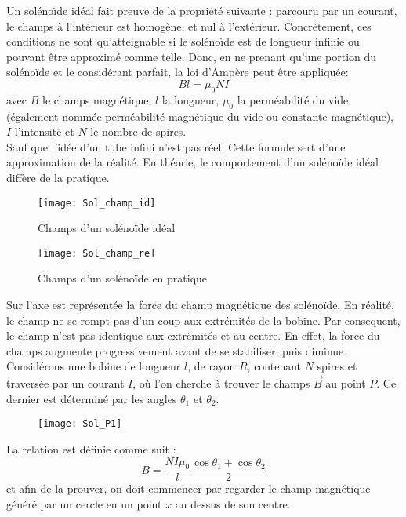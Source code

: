 Un solénoïde idéal fait preuve de la propriété suivante : parcouru par un courant, le champs à l'intérieur est homogène, et nul à l'extérieur. Concrètement, ces conditions ne sont qu'atteignable si le solénoïde est de longueur infinie ou pouvant être approximé comme telle. Donc, en ne prenant qu'une portion du solénoïde et le considérant parfait, la loi d'Ampère peut être appliquée:
$$
    Bl = \mu_0 NI 
$$
avec $B$ le champs magnétique, $l$ la longueur, $\mu_0$ la perméabilité du vide (également nommée perméabilité magnétique du vide ou constante magnétique), $I$ l'intensité et $N$ le nombre de spires.\\
Sauf que l'idée d'un tube infini n'est pas réel. Cette formule sert d'une approximation de la réalité. En théorie, le comportement d'un solénoïde idéal diffère de la pratique.
\begin{figure}[H]
  \centering
  \begin{minipage}[b]{0.4\textwidth}
    \texttt{[image: Sol\_champ\_id]}
    \caption{Champs d'un solénoïde idéal}
  \end{minipage}
  \hfill
  \begin{minipage}[b]{0.4\textwidth}
    \texttt{[image: Sol\_champ\_re]}
    \caption{Champs d'un solénoïde en pratique}
  \end{minipage}
\end{figure}
Sur l'axe est représentée la force du champ magnétique des solénoïde. En réalité, le champ ne se rompt pas d'un coup aux extrémités de la bobine. Par consequent, le champ n'est pas identique aux extrémités et au centre. En effet, la force du champs augmente progressivement avant de se stabiliser, puis diminue.\\

Considérons une bobine de longueur $l$, de rayon $R$, contenant $N$ spires et traversée par un courant $I$, où l'on cherche à trouver le champs $\vec{B}$ au point $P$. Ce dernier est déterminé par les angles $\theta_1$ et $\theta_2$.
\begin{figure}[H]
  \centering
    \texttt{[image: Sol\_P1]}
\end{figure}

\begin{invsummary}
La relation est définie comme suit :
$$ B = \frac{N I \mu_0}{l} \frac{\cos \theta_1 + \cos \theta_2}{2} $$
et afin de la prouver, on doit commencer par regarder le champ magnétique généré par un cercle en un point $x$ au dessus de son centre.
\end{invsummary}

